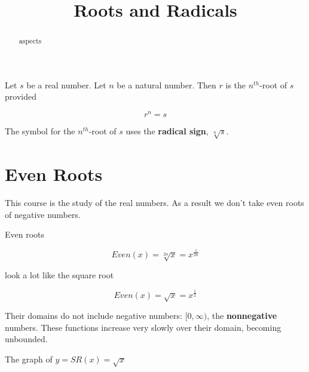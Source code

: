 \documentclass{ximera}
\title{Roots and Radicals}
\begin{document}
\begin{abstract}
aspects
\end{abstract}
\maketitle




\begin{definition}


Let $s$ be a real number. Let $n$ be a natural number.  Then $r$ is the $n^{th}$-root of $s$ provided


\[    r^n = s     \]



The symbol for the $n^{th}$-root of $s$ uses the \textbf{radical sign}, $\sqrt[n]{s}$.

\end{definition}







\section{Even Roots}

This course is the study of the real numbers. As a result we don't take even roots of negative numbers.

Even roots

\[   Even(x) = \sqrt[2n]{x} = x^{\tfrac{1}{2n}}          \]

look a lot like the square root


\[   Even(x) = \sqrt{x} = x^{\tfrac{1}{2}}          \]



Their domains do not include negative numbers: $[0, \infty)$, the \textbf{nonnegative} numbers.  These functions increase very slowly over their domain, becoming unbounded.







The graph of $y = SR(x) = \sqrt{x}$
\end{document}
